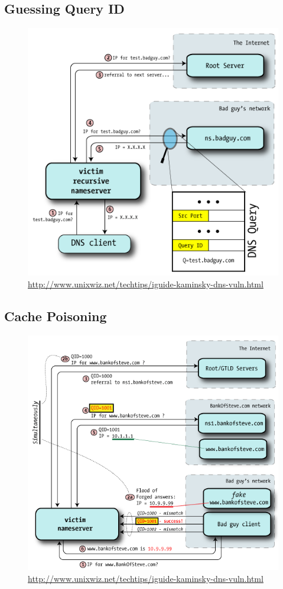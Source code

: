 \subsection{Guessing Query ID}
\begin{figure}[H]
    \includegraphics[width=\textwidth]{lazy/guessing-query-id.png}
    \url{http://www.unixwiz.net/techtips/iguide-kaminsky-dns-vuln.html}
\end{figure}
\subsection{Cache Poisoning}
\begin{figure}[H]
    \includegraphics[width=\textwidth]{lazy/cache-poisoning.png}
    \url{http://www.unixwiz.net/techtips/iguide-kaminsky-dns-vuln.html}
\end{figure}

